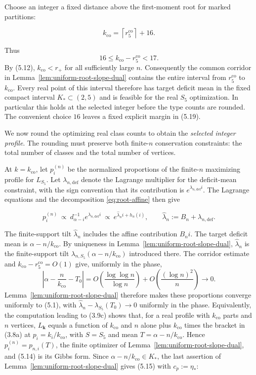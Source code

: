 \documentclass[a4paper,10pt,reqno]{amsart}
\numberwithin{equation}{section}
\theoremstyle{plain}
\theoremstyle{remark}
\begin{document}
Choose an integer a fixed distance above the first-moment root for marked partitions:

\[
 k_{\mathrm{co}}=\left\lceil r_5^{\mathrm{co}}\right\rceil+16. \tag{5.13}
\]

Thus
\[
  16\le k_{\mathrm{co}}-r_5^{\mathrm{co}}<17.
\]
By (5.12), $k_{\mathrm{co}}<r_+$ for all sufficiently large $n$.
Consequently the common corridor in
Lemma~\ref{lem:uniform-root-slope-dual} contains the entire interval
from $r_5^{\mathrm{co}}$ to $k_{\mathrm{co}}$.  Every real point of this
interval therefore has target deficit mean in the fixed compact interval
$K_*\subset(2,5)$ and is feasible for the real $S_5$ optimization.  In
particular this holds at the selected integer before the type counts are
rounded.  The convenient choice $16$ leaves a fixed explicit margin in (5.19).

We now round the optimizing real class counts to obtain the
\emph{selected integer profile}. The rounding must preserve both
finite-\(n\) conservation constraints: the total number of classes and
the total number of vertices.

At $k=k_{\mathrm{co}}$, let \(p_i^{(n)}\) be the normalized proportions
of the finite-\(n\) maximizing profile for \(L_{S_5}\). Let
\(\lambda_{n,\mathrm{def}}\) denote the Lagrange multiplier for the
deficit-mean constraint, with the sign convention that its contribution
is \(e^{\lambda_{n,\mathrm{def}}i}\).  The Lagrange equations and the
decomposition \eqref{eq:root-affine} then give

\[
 p_i^{(n)}\ \propto\ d_{\alpha-i}^{-1}e^{\lambda_{n,\mathrm{def}}i}
 \ \propto\ e^{\widehat\lambda_ni+h_n(i)},\qquad
 \widehat\lambda_n:=B_n+\lambda_{n,\mathrm{def}}.          \tag{5.14}
\]

The finite-support tilt \(\widehat\lambda_n\) includes the affine
contribution \(B_ni\).
The target deficit mean is $\alpha-n/k_{\mathrm{co}}$. By uniqueness in
Lemma~\ref{lem:uniform-root-slope-dual}, $\widehat\lambda_n$ is the finite-support
tilt $\lambda_{n,S_5}(\alpha-n/k_{\mathrm{co}})$ introduced there. The corridor estimate
and $k_{\mathrm{co}}-r_5^{\mathrm{co}}=O(1)$ give,
uniformly in the phase,
\[
 \left|\alpha-\frac n{k_{\mathrm{co}}}-T_0\right|
 =O\!\left(\frac{\log\log n}{\log n}\right)
  +O\!\left(\frac{(\log n)^2}{n}\right)
 \longrightarrow0.
\]
Lemma~\ref{lem:uniform-root-slope-dual} therefore makes these proportions
converge uniformly to (5.1), with
\(\widehat\lambda_n-\lambda_{S_5}(T_0)\to0\) uniformly in the phase.
Equivalently, the computation leading to (3.9c) shows that, for a real
profile with $k_{\mathrm{co}}$ parts and $n$ vertices, $L_{\mathbf k}$ equals
a function of $k_{\mathrm{co}}$ and $n$ alone plus $k_{\mathrm{co}}$ times
the bracket in (3.8a) at $p_i=k_i/k_{\mathrm{co}}$, with $S=S_5$ and mean
$T=\alpha-n/k_{\mathrm{co}}$. Hence $p_i^{(n)}=p_{n,i}(T)$, the finite
optimizer of Lemma~\ref{lem:uniform-root-slope-dual}, and (5.14) is its
Gibbs form.
Since $\alpha-n/k_{\mathrm{co}}\in K_*$, the last assertion of
Lemma~\ref{lem:uniform-root-slope-dual} gives (5.15) with $c_p:=\eta_*$:
\end{document}
